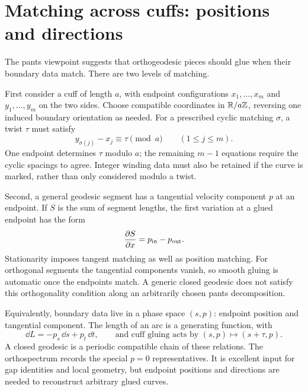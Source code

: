 \section{Matching across cuffs: positions and directions}
\label{sec:matching}

The pants viewpoint suggests that orthogeodesic pieces should glue when
their boundary data match. There are two levels of matching.

First consider a cuff of length $a$, with endpoint configurations
$x_1,\ldots,x_m$ and $y_1,\ldots,y_m$ on the two sides. Choose compatible
coordinates in $\mathbb R/a\mathbb Z$, reversing one induced boundary orientation
as needed. For a prescribed cyclic matching $\sigma$, a twist $\tau$
must satisfy
\begin{equation}
 y_{\sigma(j)}-x_j\equiv\tau\pmod a
       \qquad(1\le j\le m).
 \label{eq:endpointmatch}
\end{equation}
One endpoint determines $\tau$ modulo $a$; the remaining $m-1$ equations
require the cyclic spacings to agree. Integer winding data must also be
retained if the curve is marked, rather than only considered modulo a
twist.

Second, a general geodesic segment has a tangential velocity component
$p$ at an endpoint. If $S$ is the sum of segment lengths, the first
variation at a glued endpoint has the form
\begin{equation}
 \frac{\partial S}{\partial x}=p_{\rm in}-p_{\rm out}.
 \label{eq:momentummatch}
\end{equation}
Stationarity imposes tangent matching as well as position matching. For
orthogonal segments the tangential components vanish, so smooth gluing
is automatic once the endpoints match. A generic closed geodesic does
not satisfy this orthogonality condition along an arbitrarily chosen
pants decomposition.

Equivalently, boundary data live in a phase space $(s,p)$: endpoint
position and tangential component. The length of an arc is a generating
function, with
\[
 \dd L=-p_s\,\dd s+p_t\,\dd t,
 \qquad\text{and cuff gluing acts by }(s,p)\longmapsto(s+\tau,p).
\]
A closed geodesic is a periodic compatible chain of these relations.
The orthospectrum records the special $p=0$ representatives. It is
excellent input for gap identities and local geometry, but endpoint
positions and directions are needed to reconstruct arbitrary glued curves.

